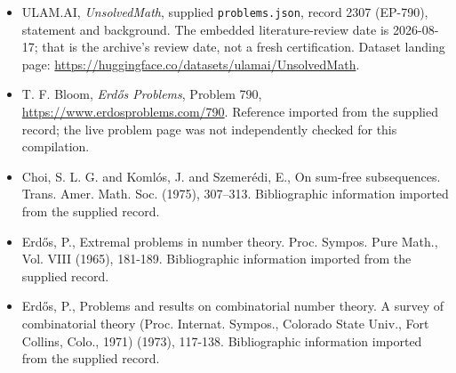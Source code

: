 \documentclass[11pt,a4paper]{article}
\begin{document}
{\small

\begin{itemize}

\item[\hypertarget{source:2307:1}{S1}] ULAM.AI, \emph{UnsolvedMath}, supplied \texttt{problems.json}, record 2307 (EP-790), statement and background. The embedded literature-review date is 2026-08-17; that is the archive’s review date, not a fresh certification. Dataset landing page: \url{https://huggingface.co/datasets/ulamai/UnsolvedMath}.

\item[\hypertarget{source:2307:2}{S2}] T. F. Bloom, \emph{Erdős Problems}, Problem 790, \url{https://www.erdosproblems.com/790}. Reference imported from the supplied record; the live problem page was not independently checked for this compilation.

\item[\hypertarget{source:2307:3}{S3}] Choi, S. L. G. and Koml\'os, J. and Szemer\'{e}di, E., On sum-free subsequences. Trans. Amer. Math. Soc. (1975), 307--313. Bibliographic information imported from the supplied record.

\item[\hypertarget{source:2307:4}{S4}] Erd\H{o}s, P., Extremal problems in number theory. Proc. Sympos. Pure Math., Vol. VIII (1965), 181-189. Bibliographic information imported from the supplied record.

\item[\hypertarget{source:2307:5}{S5}] Erd\H{o}s, P., Problems and results on combinatorial number theory. A survey of combinatorial theory (Proc. Internat. Sympos., Colorado State Univ., Fort Collins, Colo., 1971) (1973), 117-138. Bibliographic information imported from the supplied record.

\end{itemize}

}

\label{end:2307}
\end{document}
